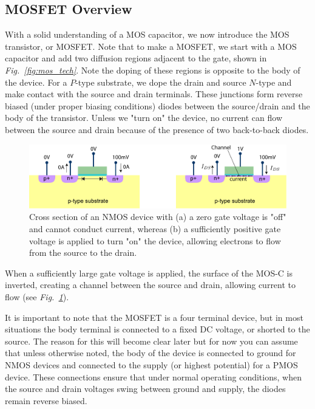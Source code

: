\subsection{MOSFET Overview}
With a solid understanding of a MOS capacitor, we now introduce the MOS transistor, or MOSFET.  Note that to make a MOSFET, we start with a MOS capacitor and add two diffusion regions adjacent to the gate, shown in \emph{Fig.~\ref{fig:mos_tech}}.  Note the doping of these regions is opposite to the body of the device.  For a $P$-type substrate, we dope the drain and source $N$-type and make contact with the source and drain terminals.  These junctions form reverse biased (under proper biasing conditions) diodes between the source/drain and the body of the transistor.  Unless we "turn on" the device, no current can flow between the source and drain because of the presence of two back-to-back diodes.
\newpage
\begin{figure}[t]
\centering
\includegraphics[width=\columnwidth]{mostfetxsect_current} 
\caption{Cross section of an NMOS device with (a) a zero gate voltage is "off" and cannot conduct current, whereas (b) a sufficiently positive gate voltage is applied to turn "on" the device, allowing electrons to flow from the source to the drain.}
\label{fig:mos_current}
\end{figure}
When a sufficiently large gate voltage is applied, the surface of the MOS-C is inverted, creating a channel between the source and drain, allowing current to flow (see \emph{Fig.~\ref{fig:mos_current}}).

It is important to note that the MOSFET is a four terminal device, but in most situations the body terminal is connected to a fixed DC voltage, or shorted to the source.  The reason for this will become clear later but for now you can assume that unless otherwise noted, the body of the device is connected to ground for NMOS devices and connected to the supply (or highest potential) for a PMOS device.  These connections ensure that under normal operating conditions, when the source and drain voltages swing between ground and supply, the diodes remain reverse biased.
